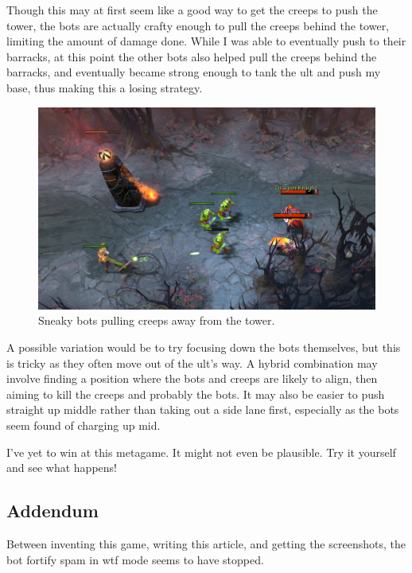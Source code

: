 \documentclass{article}
\begin{document}
Though this may at first seem like a good way to get the creeps to push the tower, the bots are actually crafty enough to pull the creeps behind the tower, limiting the amount of damage done.  While I was able to eventually push to their barracks, at this point the other bots also helped pull the creeps behind the barracks, and eventually became strong enough to tank the ult and push my base, thus making this a losing strategy.
\begin{figure}
\includegraphics[scale=0.33]{files/blog/2017_07_17_ancient_apparition_bowling/botpull.png}
\caption{Sneaky bots pulling creeps away from the tower.}
\end{figure}

A possible variation would be to try focusing down the bots themselves, but this is tricky as they often move out of the ult's way.  A hybrid combination may involve finding a position where the bots and creeps are likely to align, then aiming to kill the creeps and probably the bots.  It may also be easier to push straight up middle rather than taking out a side lane first, especially as the bots seem found of charging up mid.

I've yet to win at this metagame.  It might not even be plausible.  Try it yourself and see what happens!

\subsection*{Addendum}
Between inventing this game, writing this article, and getting the screenshots, the bot fortify spam in wtf mode seems to have stopped.
\end{document}
